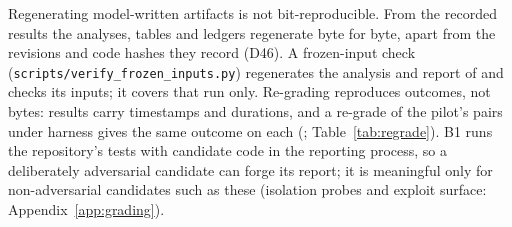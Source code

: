 Regenerating model-written artifacts is not bit-reproducible. From the recorded results the analyses, tables and ledgers regenerate byte for byte, apart from the revisions and code hashes they record (D46). A frozen-input check (\texttt{scripts/verify\_frozen\_inputs.py}) regenerates the analysis and report of \texttt{\PILOTRUN} and checks its inputs; it covers that run only. Re-grading reproduces outcomes, not bytes: results carry timestamps and durations, and a re-grade of the pilot's  pairs under harness  gives the same outcome on each (; Table~\ref{tab:regrade}). B1 runs the repository's tests with candidate code in the reporting process, so a deliberately adversarial candidate can forge its report; it is meaningful only for non-adversarial candidates such as these (isolation probes and exploit surface: Appendix~\ref{app:grading}).

